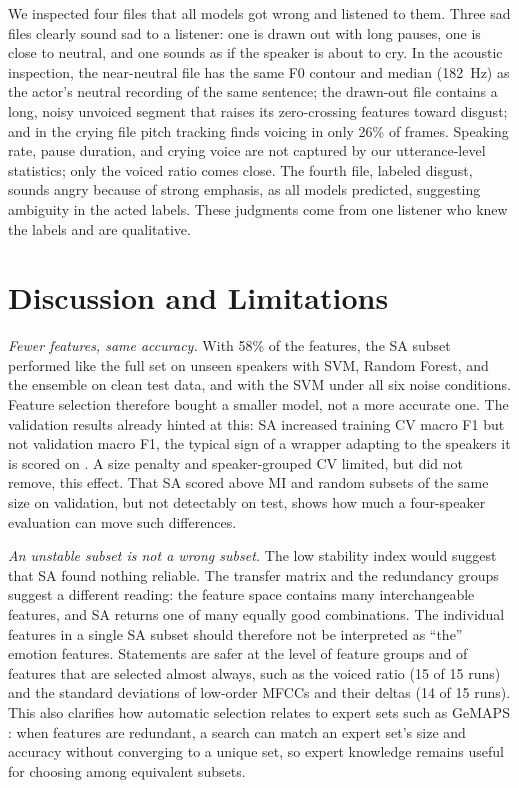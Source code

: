 \documentclass[conference]{IEEEtran}
\begin{document}
We inspected four files that all models got wrong and listened to them. Three sad files clearly
sound sad to a listener: one is drawn out with long pauses, one is close to neutral, and one
sounds as if the speaker is about to cry. In the acoustic inspection, the near-neutral file has
the same F0 contour and median (182~Hz) as the actor's neutral recording of the same sentence; the
drawn-out file contains a long, noisy unvoiced segment that raises its zero-crossing features
toward disgust; and in the crying file pitch tracking finds voicing in only 26\% of frames. Speaking rate, pause
duration, and crying voice are not captured by our utterance-level statistics; only the voiced
ratio comes close. The fourth file, labeled disgust, sounds angry because of strong emphasis, as
all models predicted, suggesting ambiguity in the acted labels. These judgments come from one
listener who knew the labels and are qualitative.

\section{Discussion and Limitations}

\emph{Fewer features, same accuracy.} With 58\% of the features, the SA subset performed like the
full set on unseen speakers with SVM, Random Forest, and the ensemble on clean test data, and with
the SVM under all six noise conditions.
Feature selection therefore bought a smaller model, not a more accurate one. The validation
results already hinted at this: SA increased training CV macro F1 but not validation macro F1,
the typical sign of a wrapper adapting to the speakers it is scored on
\cite{kohavi1997wrappers}. A size penalty and speaker-grouped CV limited, but did not remove,
this effect. That SA scored above MI and random subsets of the same size on validation, but not
detectably on test, shows how much a four-speaker evaluation can move such differences.

\emph{An unstable subset is not a wrong subset.} The low stability index would suggest that SA
found nothing reliable. The transfer matrix and the redundancy groups suggest a different reading:
the feature space contains many interchangeable features, and SA returns one of many equally good
combinations. The individual features in a single SA subset should therefore not be interpreted
as ``the'' emotion features. Statements are safer at the level of feature groups and of features
that are selected almost always, such as the voiced ratio (15 of 15 runs) and the standard
deviations of low-order MFCCs and their deltas (14 of 15 runs). This also clarifies how automatic
selection relates to expert sets such as GeMAPS \cite{eyben2016gemaps}: when features are
redundant, a search can match an expert set's size and accuracy without converging to a unique
set, so expert knowledge remains useful for choosing among equivalent subsets.
\end{document}
